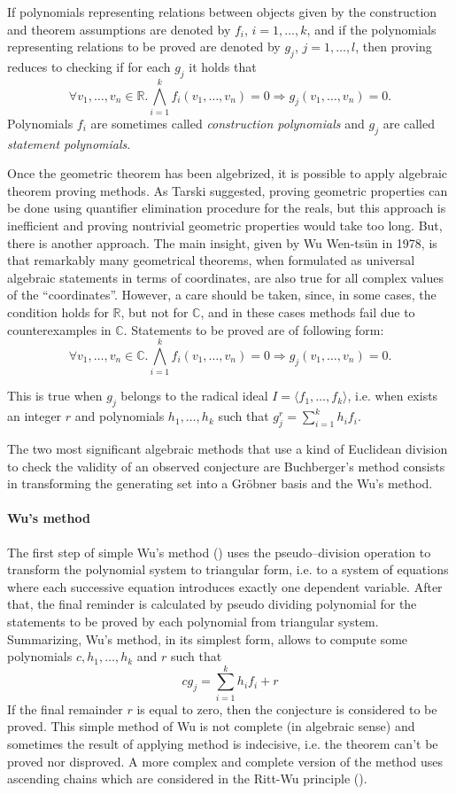 \documentclass[final,1p,times,authoryear]{elsarticle}
\begin{document}
If polynomials representing relations between objects given by the
construction and theorem assumptions are denoted by $f_i$, $i = 1,
\ldots, k$, and if the polynomials representing relations to be proved
are denoted by $g_j$, $j = 1, \ldots, l$, then proving reduces to
checking if for each $g_j$ it holds that
$$\forall v_1, \ldots, v_n \in \mathbb{R}. \bigwedge_{i = 1}^{k}
f_i(v_1, \ldots, v_n) = 0 \Longrightarrow g_j(v_1, \ldots, v_n) = 0.$$
Polynomials $f_i$ are sometimes called \emph{construction polynomials}
and $g_j$ are called \emph{statement polynomials}.

Once the geometric theorem has been algebrized, it is possible to
apply algebraic theorem proving methods.  As Tarski suggested, proving
geometric properties can be done using quantifier elimination
procedure for the reals, but this approach is inefficient and proving
nontrivial geometric properties would take too long. But, there is
another approach. The main insight, given by Wu Wen-ts\"un in 1978, is
that remarkably many geometrical theorems, when formulated as
universal algebraic statements in terms of coordinates, are also true
for all complex values of the “coordinates”. However, a care should be
taken, since, in some cases, the condition holds for $\mathbb{R}$, but
not for $\mathbb{C}$, and in these cases methods fail due to
counterexamples in $\mathbb{C}$. Statements to be proved are of
following form:
$$\forall v_1, \ldots, v_n \in \mathbb{C}. \bigwedge_{i = 1}^{k} f_i(v_1, \ldots, v_n) = 0 \Longrightarrow g_j(v_1, \ldots, v_n) = 0.$$

This is true when $g_j$ belongs to the radical ideal $I = \langle f_1,
\ldots, f_k \rangle$, i.e. when exists an integer $r$ and polynomials
$h_1, \ldots, h_k$ such that $g_j^r = \sum_{i=1}^k h_if_i$.

The two most significant algebraic methods that use a kind of
Euclidean division to check the validity of an observed conjecture are
Buchberger's method consists in transforming the generating set into a
Gr\"obner basis and the Wu's method.

\paragraph{Wu's method}

The first step of simple Wu's method (\cite{wu}) uses the
pseudo--division operation to transform the polynomial system to
triangular form, i.e. to a system of equations where each successive
equation introduces exactly one dependent variable. After that, the
final reminder is calculated by pseudo dividing polynomial for the
statements to be proved by each polynomial from triangular system.
Summarizing, Wu's method, in its simplest form, allows to compute some
polynomials $c, h_1, \ldots, h_k$ and $r$ such that
$$cg_j = \sum_{i=1}^{k}h_if_i + r$$ If the final remainder $r$ is
equal to zero, then the conjecture is considered to be proved. This
simple method of Wu is not complete (in algebraic sense) and
sometimes the result of applying method is indecisive, i.e. the
theorem can't be proved nor disproved. A more complex and complete
version of the method uses ascending chains which are considered in
the Ritt-Wu principle (\cite{ritt}).
\end{document}
